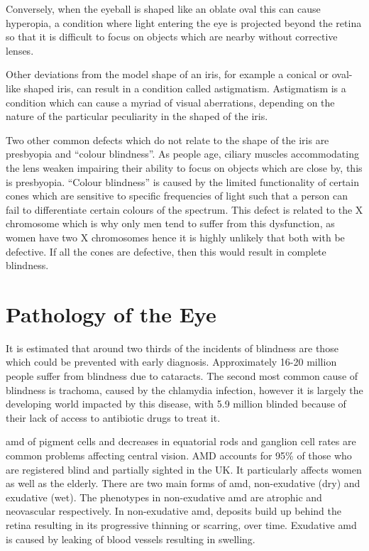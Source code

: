 Conversely, when the eyeball is shaped like an oblate oval this can
cause hyperopia, a condition where light entering the eye is projected
beyond the retina so that it is difficult to focus on objects which are
nearby without corrective lenses.

Other deviations from the model shape of an iris, for example a
conical or oval-like shaped iris, can result in a condition called
astigmatism. Astigmatism is a condition which can cause  a myriad
of visual aberrations, depending on the nature of the particular
peculiarity in the shaped of the iris.

Two other common defects which do not relate to the shape of the
iris are presbyopia and \enquote{colour blindness}. As people age,
ciliary muscles accommodating the  lens weaken impairing their ability
to focus on objects which are close by, this is presbyopia.\cite{fisher1985ciliary}
\enquote{Colour blindness} is caused by the limited functionality of
certain cones which are sensitive to specific frequencies of light such that
a person can fail to differentiate certain colours of the spectrum. This
defect is related to the X chromosome which is why only men tend to
suffer from this dysfunction, as women have two X chromosomes hence
it is highly unlikely that both with be defective.\cite{george1996clinical}
If all the cones are defective, then this would result in complete blindness.

\section{Pathology of the Eye}

It is estimated that around two thirds of the incidents of blindness are those
which could be prevented with early diagnosis.\cite{west2000looking}
Approximately 16-20 million people suffer from blindness due to
cataracts.\cite{west2000looking} The second most common cause of
blindness is trachoma, caused by the chlamydia infection, however it is
largely the developing world impacted by this disease, with 5.9 million
blinded because of their lack of access to antibiotic drugs to treat it.
\cite{west2000looking}

\Gls{amd} of pigment cells and decreases in equatorial rods and ganglion
cell rates are common problems affecting central vision.
\cite{gao1992aging} AMD accounts for 95\% of those who are
registered blind and partially sighted in the UK. It particularly
affects women as well as the elderly.
\cite{o1998age,klein2005complement,west2000looking}
There are two main forms of \acrshort{amd}, non-exudative
(dry) and exudative (wet). The phenotypes in non-exudative
\acrshort{amd} are atrophic and neovascular respectively.
\cite{kuno2011dry} In non-exudative \acrshort{amd}, deposits
build up behind the retina resulting in its progressive thinning or
scarring, over time. Exudative \acrshort{amd} is caused by leaking
of blood vessels resulting in swelling.

